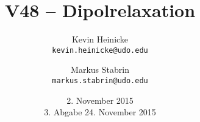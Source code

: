 



\title{%
    V48 -- Dipolrelaxation
}
\author{%
    Kevin Heinicke\\
    \texttt{kevin.heinicke@udo.edu}
    \and
    Markus Stabrin\\
    \texttt{markus.stabrin@udo.edu}
}
\date{%
    2. November 2015\\
    {\small 3. Abgabe} 24. November 2015\\
}

    \maketitle%
    \tableofcontents
    \newpage
    
    

    \printbibliography

